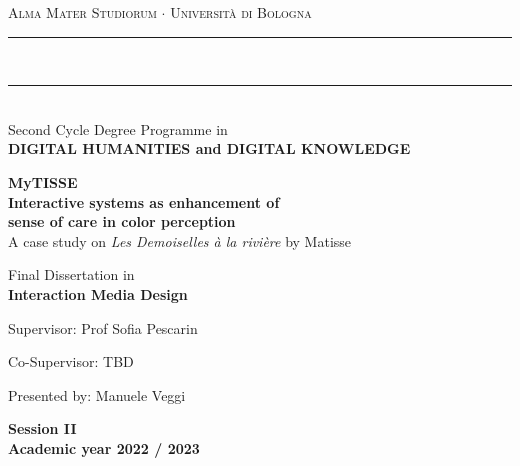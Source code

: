 \documentclass[ 12pt,  english,  onehalfspacing, headsepline, chapterinoneline, consistentlayout]{MastersDoctoralThesis} %
\author{Manuele \textsc{Veggi}} %
\begin{document}
\frontmatter %

\pagestyle{plain} %


\begin{titlepage}
\begin{center}
{{\Large{\textsc{Alma Mater Studiorum $\cdot$ Universit\`a di
				Bologna}}}} 
\rule[0.1cm]{15.8cm}{0.1mm} \\
\rule[0.5cm]{15.8cm}{0.6mm} \\
Second Cycle Degree Programme in\\{\bf DIGITAL HUMANITIES and DIGITAL KNOWLEDGE}
\end{center}
\vspace{30mm}
\begin{center}
{\LARGE{\bf MyTISSE}}\\
\vspace{3mm}
{\LARGE{\bf Interactive systems as enhancement of \\  sense of care in color perception}}\\
\vspace{3mm}
{\LARGE A case study on \textit{Les Demoiselles à la rivière} by Matisse}\\
\end{center}
\vspace{15mm}
\begin{center}
Final Dissertation in\\{\bf Interaction Media Design}
\end{center}
\vspace{15mm}
\par
{\noindent
Supervisor: Prof Sofia Pescarin
\vspace{3mm}
\par
\noindent
Co-Supervisor: TBD
\vspace{3mm}
\par
\noindent
Presented by: Manuele Veggi
}
\vspace{20mm}
\begin{center}
{\bf Session II\\
	\vspace{2mm}
	Academic year 2022 / 2023}
\end{center}
\end{titlepage}
\end{document}
